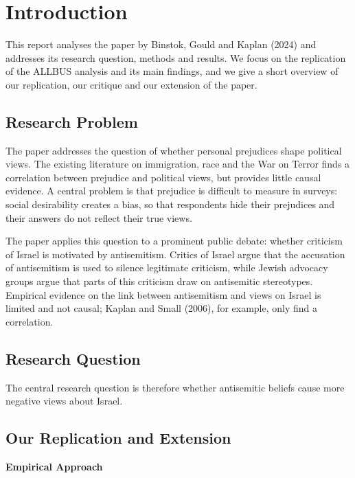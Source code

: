 \section{Introduction}

This report analyses the paper by Binstok, Gould and Kaplan (2024) and addresses its research question, methods and results. We focus on the replication of the ALLBUS analysis and its main findings, and we give a short overview of our replication, our critique and our extension of the paper.

\subsection*{Research Problem}

The paper addresses the question of whether personal prejudices shape political views. The existing literature on immigration, race and the War on Terror finds a correlation between prejudice and political views, but provides little causal evidence. A central problem is that prejudice is difficult to measure in surveys: social desirability creates a bias, so that respondents hide their prejudices and their answers do not reflect their true views.

The paper applies this question to a prominent public debate: whether criticism of Israel is motivated by antisemitism. Critics of Israel argue that the accusation of antisemitism is used to silence legitimate criticism, while Jewish advocacy groups argue that parts of this criticism draw on antisemitic stereotypes. 
Empirical evidence on the link between antisemitism and views on Israel is limited and not causal; Kaplan and Small (2006), for example, only find a correlation.

\subsection*{Research Question}

The central research question is therefore whether antisemitic beliefs cause more negative views about Israel. 

\subsection*{Our Replication and Extension}



\par\textbf{Empirical Approach}\par

